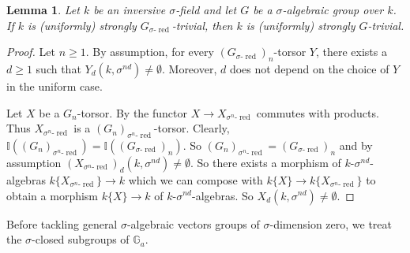 \documentclass[oneside,reqno]{amsart}
\newtheorem{lemma}[theo]{Lemma}
\theoremstyle{definition}
\newcommand{\s}{\sigma}
\newcommand{\I}{\mathbb{I}}
\newcommand{\Ga}{\mathbb{G}_a}
\newcommand{\sred}{{\sigma\text{-}\operatorname{red}}}
\begin{document}
\begin{lemma} \label{lemma: reduce to sredued for strongly}
	Let $k$ be an inversive $\s$-field and let $G$ be a $\s$-algebraic group over $k$. If $k$ is (uniformly) strongly $G_{\sred}$-trivial, then $k$ is (uniformly) strongly $G$-trivial.
\end{lemma}
\begin{proof}
	Let $n\geq 1$. By assumption, for every $(G_{\sred})_n$-torsor $Y$, there exists a $d\geq 1$ such that $Y_d(k,\s^{nd})\neq\emptyset$. Moreover, $d$ does not depend on the choice of $Y$ in the uniform case.
	
	Let $X$ be a $G_n$-torsor. By \cite[Cor. 2.9 (ii)]{Wibmer:almostsimple} the functor $X\to X_{\s^n\text{-}\operatorname{red}}$ commutes with products. Thus $X_{\s^n\text{-}\operatorname{red}}$ is a $(G_n)_{\s^n\text{-}\operatorname{red}}$-torsor. Clearly, $\I((G_n)_{\s^n\text{-}\operatorname{red}})=\I((G_{\sred})_n)$. So $(G_n)_{\s^n\text{-}\operatorname{red}}=(G_{\sred})_n$ and by assumption  $(X_{\s^n\text{-}\operatorname{red}})_d(k,\s^{nd})\neq\emptyset$. So there exists a morphism of $k$-$\s^{nd}$-algebras $k\{X_{\s^n\text{-}\operatorname{red}}\}\to k$ which we can compose with $k\{X\}\to k\{X_{\s^n\text{-}\operatorname{red}}\}$ to obtain a morphism $k\{X\}\to k$ of $k$-$\s^{nd}$-algebras. So $X_d(k,\s^{nd})\neq\emptyset$.
\end{proof}


Before tackling general $\s$-algebraic vectors groups of $\s$-dimension zero, we treat the $\s$-closed subgroups of $\Ga$.
\end{document}
